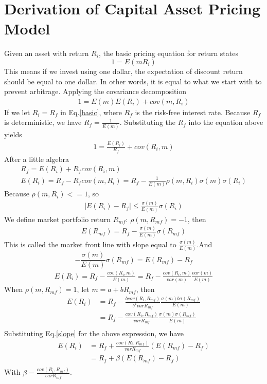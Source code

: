 \documentclass[a4paper]{article}
\begin{document}
\section{Derivation of Capital Asset Pricing Model}
Given an asset with return $R_i$, the basic pricing equation for return states
\begin{equation} \label{basic}
	1 = E(m R_i)
\end{equation}
This means if we invest using one dollar, the expectation of discount return should be equal to one dollar. In other words, it is equal to what we start with to prevent arbitrage.
Applying the covariance decomposition
\begin{align*}
	1 = E(m)E(R_i) + cov(m, R_i)
\end{align*}
If we let $R_i = R_f$ in Eq.\ref{basic}, where $R_f$ is the risk-free interest rate. Because $R_f$ is deterministic, we have $R_f = \frac{1}{E(m)}$. Substituting the $R_f$ into the equation above yields
\begin{align*}
	1 = \frac {E(R_i)}{R_f} + cov(R_i, m)
\end{align*}
After a little algebra
\begin{align*}
	R_f = E(R_i) + R_f cov(R_i, m)\\
	E(R_i) = R_f  -R_fcov(m, R_i) 
	= R_f -\frac{1}{E(m)} \rho(m, R_i)\sigma(m) \sigma(R_i)
\end{align*}
Because $\rho(m, R_i) <= 1$, so
\begin{align*}
	|E(R_i) - R_f| \leq \frac{\sigma(m)}{E(m)}\sigma(R_i)
\end{align*}
We define market portfolio return $R_{mf}$: $\rho(m, R_{mf}) = -1$, then 
\begin{align*}
	E(R_{mf}) =  R_f - \frac{\sigma(m)}{E(m)} \sigma(R_{mf}) 
\end{align*}
This is called the market front line with slope equal to $\frac{\sigma(m)}{E(m)}$.And
\begin{equation} \label{slope}
	-\frac{\sigma(m)}{E(m)} \sigma(R_{mf})= E(R_{mf}) - R_f
\end{equation}
\begin{align*}
	E(R_i) = R_f -\frac{cov(R_i, m)}{E(m)}
	       = R_f - \frac{cov(R_i, m)}{var(m)} \frac{var(m)}{E(m)}
\end{align*}
When $\rho(m, R_{mf}) = 1$, let $m = a + bR_{mf}$, then
\begin{align*}
	E(R_i) & = R_f - \frac{b cov(R_i, R_{mf})}{b^2 var{R_{mf}}}
	\frac{\sigma(m)b\sigma(R_{mf})}{E(m)}\\
	       & = R_f - \frac{ cov(R_i, R_{mf})}{ var{R_{mf}}}
	\frac{\sigma(m) \sigma(R_{mf})}{E(m)}\\
\end{align*}
Substituting Eq.\ref{slope} for the above expression, we have
\begin{align*}
	E(R_i) & =R_f + \frac{cov(R_i, R_{mf})}{var{R_{mf}}}(E(R_{mf}) - R_f)\\
	& =R_f + \beta(E(R_{mf}) - R_f)\\
\end{align*}
With $\beta=\frac{cov(R_i, R_{mf})}{var{R_{mf}}}$.
\end{document}
